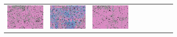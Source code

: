 \documentclass{ipol}
\begin{document}
\begin{figure}[ht]
\begin{subfigure}[t]{\linewidth}
\begin{tabular}{ccccccccc}
                \includegraphics[width=\s]{images/carnival/DCB/iso_j100_64_grids.png}&
                \includegraphics[width=\s]{images/carnival/DHT/iso_j100_64_grids.png}&
                \includegraphics[width=\s]{images/carnival/LINEAR/iso_j100_64_grids.png}&

\end{tabular}
\end{subfigure}
\end{figure}
\end{document}
